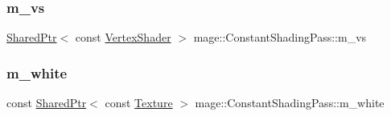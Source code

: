 \subsubsection{\texorpdfstring{m\+\_\+vs}{m\_vs}}
{\footnotesize\ttfamily \hyperlink{namespacemage_a1e01ae66713838a7a67d30e44c67703e}{Shared\+Ptr}$<$ const \hyperlink{classmage_1_1_vertex_shader}{Vertex\+Shader} $>$ mage\+::\+Constant\+Shading\+Pass\+::m\+\_\+vs\hspace{0.3cm}{\ttfamily [private]}}

\hypertarget{classmage_1_1_constant_shading_pass_aa5c9222b0de16e351b90752150d584d1}{}\label{classmage_1_1_constant_shading_pass_aa5c9222b0de16e351b90752150d584d1} 
\subsubsection{\texorpdfstring{m\+\_\+white}{m\_white}}
{\footnotesize\ttfamily const \hyperlink{namespacemage_a1e01ae66713838a7a67d30e44c67703e}{Shared\+Ptr}$<$ const \hyperlink{classmage_1_1_texture}{Texture} $>$ mage\+::\+Constant\+Shading\+Pass\+::m\+\_\+white\hspace{0.3cm}{\ttfamily [private]}}


